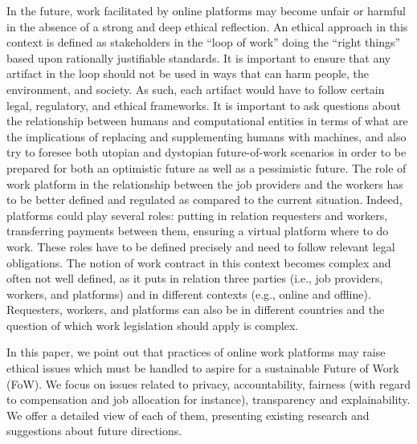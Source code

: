 \documentclass[11pt]{article}
\begin{document}
In the future, work facilitated by online platforms may become unfair or harmful in the absence of a strong and deep ethical reflection. An ethical approach in this context is defined as stakeholders in the ``loop of work'' doing the ``right things'' based upon rationally justifiable standards. It is important to ensure that any artifact in the loop should not be used in ways that can harm people, the environment, and society. As such, each artifact would have to follow certain legal, regulatory, and ethical frameworks. It is important to ask questions about the relationship between humans and computational entities in terms of what are the implications of replacing and supplementing humans with machines, and also try to foresee both utopian and dystopian future-of-work scenarios in order to be prepared for both an optimistic future as well as a pessimistic future. The role of work platform  in the relationship between the job providers and the workers has to be better defined and regulated as compared to the current situation. Indeed, platforms could play several roles: putting in relation requesters and workers, transferring payments between them, ensuring a virtual platform where to do work. These roles have to be defined precisely and need to follow relevant legal obligations. The notion of work contract in this context becomes complex and often not well defined, as it puts in relation three parties (i.e., job providers, workers, and platforms) and in different contexts (e.g., online and offline). Requesters, workers, and platforms can also be in different countries and the question of which work legislation should apply is complex.

\clearpage

In this paper, we point out that practices of online work platforms may raise ethical issues which must be handled to aspire for a sustainable Future of Work (FoW). We focus on issues related to privacy, accountability, fairness (with regard to compensation and job allocation for instance), transparency and explainability. We offer a detailed view of each of them, presenting existing research and suggestions about future directions.
\end{document}

